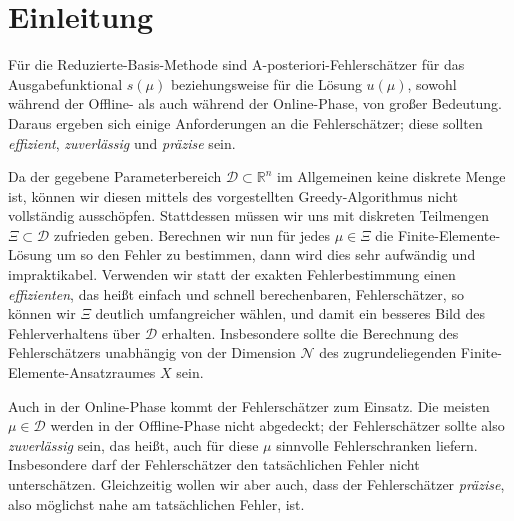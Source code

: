 
\section{Einleitung} %
\label{sec:einleitung}

Für die Reduzierte-Basis-Methode sind A-posteriori-Fehlerschätzer für das Ausgabefunktional $s(\mu)$ beziehungsweise für die Lösung $u(\mu)$, sowohl während der Offline- als auch während der Online-Phase, von großer Bedeutung.
Daraus ergeben sich einige Anforderungen an die Fehlerschätzer; diese sollten \emph{effizient}, \emph{zuverlässig} und \emph{präzise} sein.

Da der gegebene Parameterbereich $\mathcal D \subset \mathbb{R}^n$ im Allgemeinen keine diskrete Menge ist, können wir diesen mittels des vorgestellten Greedy-Algorithmus nicht vollständig ausschöpfen.
Stattdessen müssen wir uns mit diskreten Teilmengen $\Xi \subset \mathcal D$ zufrieden geben.
Berechnen wir nun für jedes $\mu \in \Xi$ die Finite-Elemente-Lösung um so den Fehler zu bestimmen, dann wird dies sehr aufwändig und impraktikabel.
Verwenden wir statt der exakten Fehlerbestimmung einen \emph{effizienten}, das heißt einfach und schnell berechenbaren, Fehlerschätzer, so können wir $\Xi$ deutlich umfangreicher wählen, und damit ein besseres Bild des Fehlerverhaltens über $\mathcal D$ erhalten.
Insbesondere sollte die Berechnung des Fehlerschätzers unabhängig von der Dimension $\mathcal N$ des zugrundeliegenden Finite-Elemente-Ansatzraumes $X$ sein.

Auch in der Online-Phase kommt der Fehlerschätzer zum Einsatz.
Die meisten $\mu \in \mathcal D$ werden in der Offline-Phase nicht abgedeckt; der Fehlerschätzer sollte also \emph{zuverlässig} sein, das heißt, auch für diese $\mu$ sinnvolle Fehlerschranken liefern.
Insbesondere darf der Fehlerschätzer den tatsächlichen Fehler nicht unterschätzen.
Gleichzeitig wollen wir aber auch, dass der Fehlerschätzer \emph{präzise}, also möglichst nahe am tatsächlichen Fehler, ist.

